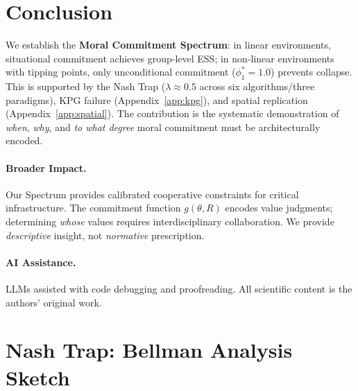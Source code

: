 \documentclass{article}
\begin{document}
\section{Conclusion}

We establish the \textbf{Moral Commitment Spectrum}: in linear environments, situational commitment achieves group-level ESS; in non-linear environments with tipping points, only unconditional commitment ($\phi_1^* = 1.0$) prevents collapse.
This is supported by the Nash Trap ($\lambda{\approx}0.5$ across six algorithms/three paradigms), KPG failure (Appendix~\ref{app:kpg}), and spatial replication (Appendix~\ref{app:spatial}).
The contribution is the systematic demonstration of \emph{when}, \emph{why}, and \emph{to what degree} moral commitment must be architecturally encoded.

\paragraph{Broader Impact.}\label{sec:broader_impact}
Our Spectrum provides calibrated cooperative constraints for critical infrastructure.
The commitment function $g(\theta, R)$ encodes value judgments; determining \emph{whose} values requires interdisciplinary collaboration. We provide \textit{descriptive} insight, not \textit{normative} prescription.

\paragraph{AI Assistance.} LLMs assisted with code debugging and proofreading. All scientific content is the authors' original work.




\newpage
\appendix

\section{Nash Trap: Bellman Analysis Sketch}
\label{app:nash_trap}
\end{document}
